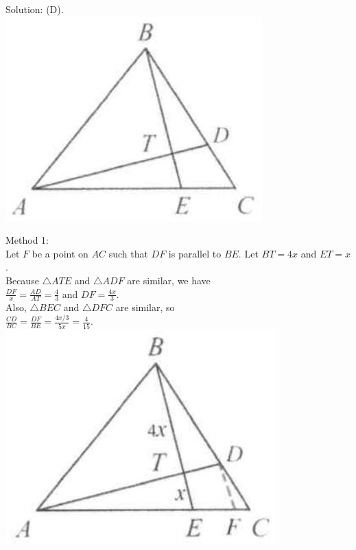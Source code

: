 \documentclass[10pt]{article}
\begin{document}
Solution: (D).\\
\includegraphics[max width=\textwidth, center]{2025_04_17_97bc1f7e44d93c271a88g-104}

Method 1:\\
Let \(F\) be a point on \(A C\) such that \(D F\) is parallel to \(B E\). Let \(B T=4 x\) and \(E T=x\).\\
Because \(\triangle A T E\) and \(\triangle A D F\) are similar, we have\\
\(\frac{D F}{x}=\frac{A D}{A T}=\frac{4}{3}\) and \(D F=\frac{4 x}{3}\).\\
Also, \(\triangle B E C\) and \(\triangle D F C\) are similar, so\\
\(\frac{C D}{B C}=\frac{D F}{B E}=\frac{4 x / 3}{5 x}=\frac{4}{15}\).\\
\includegraphics[max width=\textwidth, center]{2025_04_17_97bc1f7e44d93c271a88g-104(1)}
\end{document}
